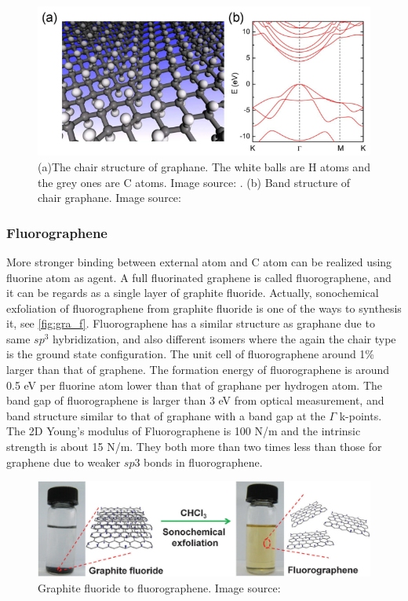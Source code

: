 \begin{figure}[htbp!] 
\centering  
\includegraphics[width=1\textwidth]{graphane.eps}
\caption[Atomic and electronic structure of graphane]{(a)The chair structure of graphane. The white balls are H atoms and the grey ones are C atoms. Image source: \cite{Sofo2007}. (b) Band structure of chair graphane. Image source: \cite{leenaerts2010}}  
\label{fig:gra_h}
\end{figure} 

\subsubsection{Fluorographene}

More stronger binding between external atom and C atom can be realized using fluorine atom as agent. A full fluorinated graphene is called fluorographene, and it can be regards as a single layer of graphite fluoride. Actually, sonochemical exfoliation of fluorographene from graphite fluoride is one of the ways to synthesis it, see \autoref{fig:gra_f}\cite{Zhu2013}. Fluorographene has a similar structure as graphane due to same $sp^3$ hybridization, and also different isomers where the again the chair type is the ground state configuration\cite{samarakoon2011}. The unit cell of fluorographene around 1\% larger than that of graphene\cite{nair2010}. The formation energy of fluorographene is around 0.5 eV per fluorine atom lower than that of graphane per hydrogen atom\cite{Jeon2011}. The band gap of fluorographene is larger than 3 eV from optical measurement\cite{nair2010,Jeon2011}, and band structure similar to that of graphane with a band gap at the $\Gamma$ k-points. The 2D Young's modulus of Fluorographene is 100 \si{N/m} and the intrinsic strength is about 15 \si{N/m}. They both more than two times less than those for graphene due to weaker $sp3$ bonds in fluorographene\cite{nair2010}.

\begin{figure}[htbp!] 
\centering  
\includegraphics[width=1\textwidth]{fluorographene.png}
\caption{Graphite fluoride to fluorographene. Image source:\cite{Zhu2013}}  
\label{fig:gra_f}
\end{figure} 

